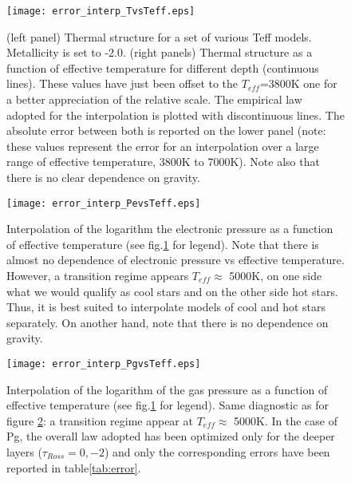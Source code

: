 \documentclass[11pt]{article}
\begin{document}
\begin{figure}[h!]
\begin{center}
\texttt{[image: error\_interp\_TvsTeff.eps]}
 \caption{(left panel) Thermal structure for a set of various Teff models. Metallicity is set to -2.0.  (right panels) Thermal structure as a function of effective temperature for different depth (continuous lines). These values have just been offset to the $T_{eff}$=3800K one for a better appreciation of the relative scale. The empirical law adopted for the interpolation is plotted with discontinuous lines. The absolute error between both is reported on the lower panel (note: these values represent the error for an interpolation over a large range of effective temperature, 3800K to 
7000K). Note also that there is no clear dependence on gravity. }
\label{fig:errorintTT}
\end{center}
\end{figure}

\begin{figure}[h!]
\begin{center}            
\texttt{[image: error\_interp\_PevsTeff.eps]}
\caption{Interpolation of the logarithm the electronic pressure as a function of effective temperature (see fig.\ref{fig:errorintTT} for legend). Note that there is almost no dependence of electronic pressure vs effective temperature. However, a transition regime appears $T_{eff} \approx$ 5000K, on one side what we would qualify as cool stars and on the other side hot stars. Thus, it is best suited to interpolate models of cool and hot stars separately. On another hand, note that there is no dependence on gravity. }\label{fig:errorintTPe}
\end{center}
\end{figure}

\begin{figure}[h!]
\begin{center}            
\texttt{[image: error\_interp\_PgvsTeff.eps]}
\caption{Interpolation of the logarithm of the gas pressure as a function of effective temperature (see fig.\ref{fig:errorintTT} for legend). Same diagnostic as for figure \ref{fig:errorintTPe}: a transition regime appear at $T_{eff} \approx$ 5000K. In the case of Pg, the overall law adopted has been optimized only for the deeper layers ($\tau_{Ross} =0,-2$) and only the corresponding errors have been reported in table\ref{tab:error}. }\label{fig:errorintTPg}
\end{center}
\end{figure}
\end{document}
